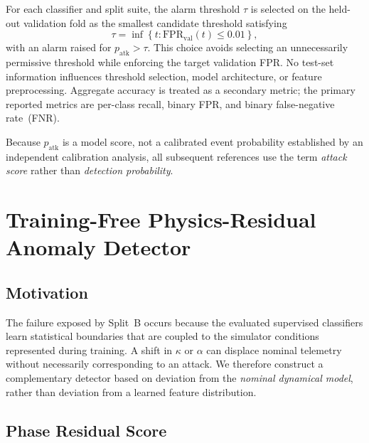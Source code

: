 \documentclass[journal,twocolumn]{IEEEtran}
\newcommand{\patk}{p_{\mathrm{atk}}}
\newcommand{\kap}{\kappa}
\begin{document}
For each classifier and split suite, the alarm threshold $\tau$ is selected on the
held-out validation fold as the smallest candidate threshold satisfying
\begin{equation}
  \tau = \inf\left\{t:\mathrm{FPR}_\mathrm{val}(t)\leq0.01\right\},
  \label{eq:threshold}
\end{equation}
with an alarm raised for $\patk>\tau$. This choice avoids selecting an
unnecessarily permissive threshold while enforcing the target validation FPR. No
test-set information influences threshold selection, model architecture, or feature
preprocessing. Aggregate accuracy is treated as a secondary metric; the primary
reported metrics are per-class recall, binary FPR, and binary false-negative
rate~(FNR).

Because $\patk$ is a model score, not a calibrated event probability established by
an independent calibration analysis, all subsequent references use the term
\emph{attack score} rather than \emph{detection probability}.

\section{Training-Free Physics-Residual Anomaly Detector}
\label{sec:piad}

\subsection{Motivation}

The failure exposed by Split~B occurs because the evaluated supervised classifiers
learn statistical boundaries that are coupled to the simulator conditions represented
during training. A shift in $\kap$ or $\alpha$ can displace nominal telemetry without
necessarily corresponding to an attack. We therefore construct a complementary
detector based on deviation from the \emph{nominal dynamical model}, rather than
deviation from a learned feature distribution.

\subsection{Phase Residual Score}
\end{document}
